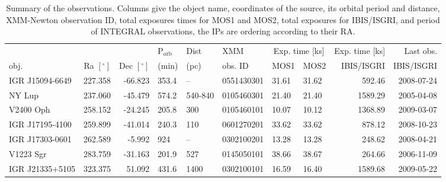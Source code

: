 \documentclass[oneside,a4paper,11pt]{report}
\begin{document}
\begin{table}
\begin{center}
\caption{Summary of the observations. Columns give the object name, coordinates of the source, its orbital period and distance, XMM-Newton 
observation ID, total exposures times for MOS1 and MOS2, total exposures for IBIS/ISGRI, and period of INTEGRAL observations, 
the IPs are ordering according to their RA.}
\begin{tabular}{lrrlllllrr}
\hline
\hline
     &                         &                          &$\mathrm{P_{orb}}$ & Dist &XMM      & \multicolumn{2}{c}{Exp. time [ks]}&Exp. time [ks] & Last obs.  \\
obj. & Ra $\mathrm{[^{\circ}]}$& Dec $\mathrm{[^{\circ}]}$&(min)            &(pc)  &obs. ID  & MOS1&MOS2                         & IBIS/ISGRI    & IBIS/ISGRI \\ 
\hline
IGR J15094-6649&  227.358  & -66.823 &353.4&--& 0551430301&31.61     & 31.62& 592.46      &    2008-07-24                 \\
NY Lup         &  237.060  & -45.479 &574.2&540-840& 0105460301&21.40     & 21.40& 1589.29     &    2005-04-08                \\
V2400 Oph      &  258.152  & -24.245 &205.8&300& 0105460101&10.07     &10.12& 1368.89     &      2009-03-07                \\
IGR J17195-4100&  259.899  & -41.014 &240.3&110& 0601270201&33.62     &33.62&  878.12    &     2008-10-23              \\
IGR J17303-0601&  262.589  &  -5.992 &924&--& 0302100201&13.28     &13.28&   248.62   &       2008-04-21              \\
V1223 Sgr      &  283.759  & -31.163 &201.9&527& 0145050101&38.66     &38.67&   264.66  &     2006-11-09               \\
IGR J21335+5105&  323.375  &  51.092 &431.6&1400& 0302100101&16.59     &16.40 & 1589.68    &  2009-05-22                   \\
\hline
\end{tabular}
\label{RES1}
\end{center}
\end{table}
\end{document}
